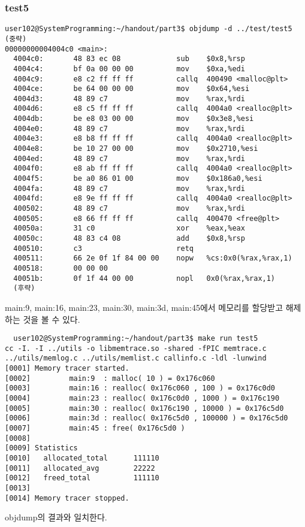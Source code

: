 \documentclass{report}
\begin{document}
\subsubsection{test5}
\begin{verbatim}
user102@SystemProgramming:~/handout/part3$ objdump -d ../test/test5
(중략)
00000000004004c0 <main>:
  4004c0:       48 83 ec 08             sub    $0x8,%rsp
  4004c4:       bf 0a 00 00 00          mov    $0xa,%edi
  4004c9:       e8 c2 ff ff ff          callq  400490 <malloc@plt>
  4004ce:       be 64 00 00 00          mov    $0x64,%esi
  4004d3:       48 89 c7                mov    %rax,%rdi
  4004d6:       e8 c5 ff ff ff          callq  4004a0 <realloc@plt>
  4004db:       be e8 03 00 00          mov    $0x3e8,%esi
  4004e0:       48 89 c7                mov    %rax,%rdi
  4004e3:       e8 b8 ff ff ff          callq  4004a0 <realloc@plt>
  4004e8:       be 10 27 00 00          mov    $0x2710,%esi
  4004ed:       48 89 c7                mov    %rax,%rdi
  4004f0:       e8 ab ff ff ff          callq  4004a0 <realloc@plt>
  4004f5:       be a0 86 01 00          mov    $0x186a0,%esi
  4004fa:       48 89 c7                mov    %rax,%rdi
  4004fd:       e8 9e ff ff ff          callq  4004a0 <realloc@plt>
  400502:       48 89 c7                mov    %rax,%rdi
  400505:       e8 66 ff ff ff          callq  400470 <free@plt>
  40050a:       31 c0                   xor    %eax,%eax
  40050c:       48 83 c4 08             add    $0x8,%rsp
  400510:       c3                      retq
  400511:       66 2e 0f 1f 84 00 00    nopw   %cs:0x0(%rax,%rax,1)
  400518:       00 00 00
  40051b:       0f 1f 44 00 00          nopl   0x0(%rax,%rax,1)
  (후략)

\end{verbatim}
main:9, main:16, main:23, main:30, main:3d, main:45에서 메모리를 할당받고 해제하는 것을 볼 수 있다.

\begin{verbatim}
  user102@SystemProgramming:~/handout/part3$ make run test5
cc -I. -I ../utils -o libmemtrace.so -shared -fPIC memtrace.c ../utils/memlog.c ../utils/memlist.c callinfo.c -ldl -lunwind
[0001] Memory tracer started.
[0002]         main:9  : malloc( 10 ) = 0x176c060
[0003]         main:16 : realloc( 0x176c060 , 100 ) = 0x176c0d0
[0004]         main:23 : realloc( 0x176c0d0 , 1000 ) = 0x176c190
[0005]         main:30 : realloc( 0x176c190 , 10000 ) = 0x176c5d0
[0006]         main:3d : realloc( 0x176c5d0 , 100000 ) = 0x176c5d0
[0007]         main:45 : free( 0x176c5d0 )
[0008]
[0009] Statistics
[0010]   allocated_total      111110
[0011]   allocated_avg        22222
[0012]   freed_total          111110
[0013]
[0014] Memory tracer stopped.
\end{verbatim}
objdump의 결과와 일치한다.
\end{document}
